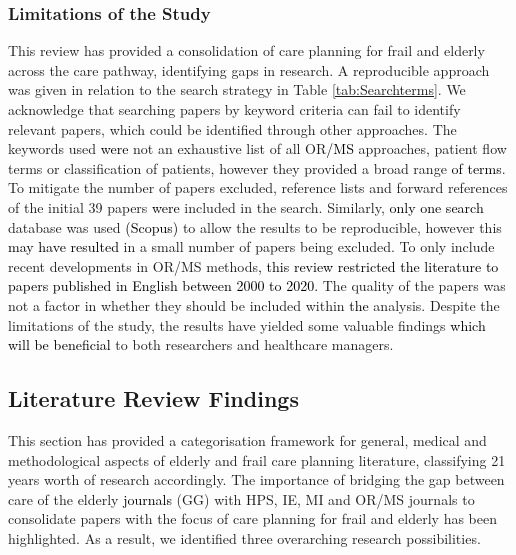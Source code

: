 \documentclass[../thesis.tex]{subfiles}
\begin{document}
\subsubsection{Limitations of the Study}
This review has provided a consolidation of care planning for frail and elderly across the care pathway, identifying gaps in research. A reproducible approach was given in relation to the search strategy in Table \ref{tab:Searchterms}. We acknowledge that searching papers by keyword criteria can fail to identify relevant papers, which could be identified through other approaches. The keywords used \textcolor{black}{were} not an exhaustive list of all OR\textcolor{black}{/MS} approaches, patient flow terms or classification of patients, however they provide\textcolor{black}{d} a broad range \textcolor{black}{of terms}. To mitigate the number of papers excluded, reference lists and forward references of the initial 39 papers \textcolor{black}{were} included in the search. Similarly, \textcolor{black}{only one search} database was used \textcolor{black}{(Scopus)} to allow the results to be reproducible, however this \textcolor{black}{may have resulted} in a small number of papers being excluded. To only include recent developments in OR/MS methods\textcolor{black}{, this review restricted the literature to papers published in English between 2000 to 2020.} The quality of the papers was not a factor in whether they should be included within \textcolor{black}{the} analysis. Despite the limitations of the study, the results have yielded some valuable findings \textcolor{black}{which will be beneficial} to both researchers and healthcare managers.

\subsection{Literature Review Findings}\label{sec:Conclusion}
This section has provided a categorisation framework for general, medical and methodological aspects of elderly and frail care planning literature, classifying 21 years worth of research accordingly. The importance of bridging the gap between care of the elderly \textcolor{black}{journals} (GG) with HPS, IE, MI and OR/MS journals to consolidate papers with the focus of care planning for frail and elderly has been highlighted. As a result, we identified three overarching research possibilities.   
\end{document}
